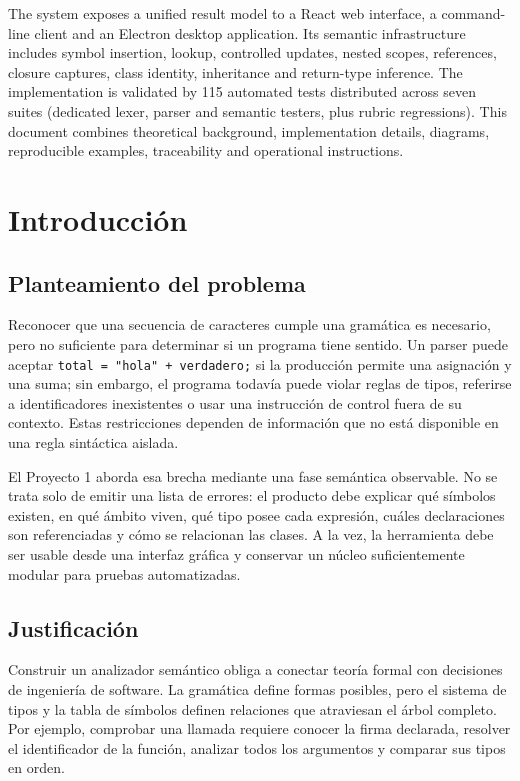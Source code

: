 \documentclass[11pt,letterpaper,oneside]{report}
\newcommand{\codigo}[1]{\texttt{#1}}
\begin{document}
The system exposes a unified result model to a React web interface, a command-line
client and an Electron desktop application. Its semantic infrastructure includes
symbol insertion, lookup, controlled updates, nested scopes, references, closure
captures, class identity, inheritance and return-type inference. The implementation
is validated by 115 automated tests distributed across seven suites (dedicated lexer,
parser and semantic testers, plus rubric regressions). This document
combines theoretical background, implementation details, diagrams, reproducible
examples, traceability and operational instructions.

\tableofcontents
\listoffigures
\listoftables
\clearpage
{}

\chapter{Introducción}

\section{Planteamiento del problema}

Reconocer que una secuencia de caracteres cumple una gramática es necesario, pero no
suficiente para determinar si un programa tiene sentido. Un parser puede aceptar
\codigo{total = "hola" + verdadero;} si la producción permite una asignación y una
suma; sin embargo, el programa todavía puede violar reglas de tipos, referirse a
identificadores inexistentes o usar una instrucción de control fuera de su contexto.
Estas restricciones dependen de información que no está disponible en una regla
sintáctica aislada.

El Proyecto 1 aborda esa brecha mediante una fase semántica observable. No se trata
solo de emitir una lista de errores: el producto debe explicar qué símbolos existen,
en qué ámbito viven, qué tipo posee cada expresión, cuáles declaraciones son
referenciadas y cómo se relacionan las clases. A la vez, la herramienta debe ser
usable desde una interfaz gráfica y conservar un núcleo suficientemente modular para
pruebas automatizadas.

\section{Justificación}

Construir un analizador semántico obliga a conectar teoría formal con decisiones de
ingeniería de software. La gramática define formas posibles, pero el sistema de tipos
y la tabla de símbolos definen relaciones que atraviesan el árbol completo. Por
ejemplo, comprobar una llamada requiere conocer la firma declarada, resolver el
identificador de la función, analizar todos los argumentos y comparar sus tipos en
orden.
\end{document}
